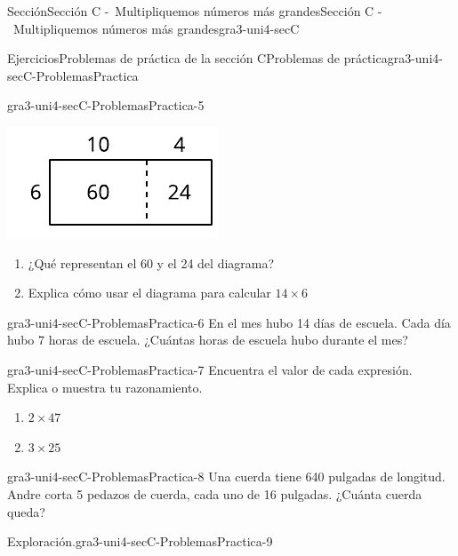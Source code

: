 \documentclass[twoside,10pt,]{article}
\begin{document}
\begin{sectionptx}{Sección}{Sección C -~Multipliquemos números más grandes}{}{Sección C -~Multipliquemos números más grandes}{}{}{gra3-uni4-secC}
\begin{exercises-subsection}{Ejercicios}{Problemas de práctica de la sección C}{}{Problemas de práctica}{}{}{gra3-uni4-secC-ProblemasPractica}
\begin{divisionexercise}{3}{}{}{gra3-uni4-secC-ProblemasPractica-5}
\begin{sidebyside}{2}{0.0125}{0.0125}{0.025}
\begin{sbspanel}{0.35}
\includegraphics[width=\linewidth]{external/svg-source/tikz-file-151678-scale13.pdf}
\end{sbspanel}%
\begin{sbspanel}{0.6}%
%
\begin{enumerate}[label={(\alph*)}]
\item{}¿Qué representan el 60 y el 24 del diagrama?%
\item{}Explica cómo usar el diagrama para calcular \(14 \times 6\)%
\end{enumerate}
\end{sbspanel}%
\end{sidebyside}%
\end{divisionexercise}%
\begin{divisionexercise}{4}{}{}{gra3-uni4-secC-ProblemasPractica-6}%
En el mes hubo 14 días de escuela. Cada día hubo 7 horas de escuela. ¿Cuántas horas de escuela hubo durante el mes?%
\end{divisionexercise}%
\begin{divisionexercise}{5}{}{}{gra3-uni4-secC-ProblemasPractica-7}%
Encuentra el valor de cada expresión. Explica o muestra tu razonamiento.%
%
\begin{enumerate}[label={(\alph*)}]
\item{}\(\displaystyle 2 \times 47\)%
\item{}\(\displaystyle 3 \times 25\)%
\end{enumerate}
\end{divisionexercise}%
\begin{divisionexercise}{6}{}{}{gra3-uni4-secC-ProblemasPractica-8}%
Una cuerda tiene 640 pulgadas de longitud. Andre corta 5 pedazos de cuerda, cada uno de 16 pulgadas. ¿Cuánta cuerda queda?%
\end{divisionexercise}%
\begin{divisionexercise}{7}{Exploración.}{}{gra3-uni4-secC-ProblemasPractica-9}%

\end{divisionexercise}
\end{exercises-subsection}
\end{sectionptx}
\end{document}

